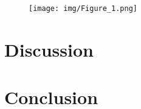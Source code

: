 \documentclass[utf8]{article}
\begin{document}
\begin{figure}[H]
  \centering
	\texttt{[image: img/Figure\_1.png]}
  \label{fig:logo}
\end{figure}

\newpage

\section{Discussion}
    

\section{Conclusion}
\end{document}
